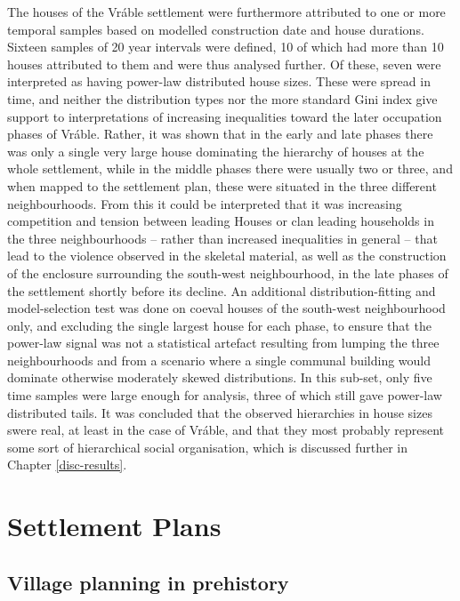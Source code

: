 \documentclass[
  12pt,
  a4paper, twoside]{book}
\begin{document}
The houses of the Vráble settlement were furthermore attributed to one or more temporal samples based on modelled construction date and house durations. Sixteen samples of 20 year intervals were defined, 10 of which had more than 10 houses attributed to them and were thus analysed further. Of these, seven were interpreted as having power-law distributed house sizes. These were spread in time, and neither the distribution types nor the more standard Gini index give support to interpretations of increasing inequalities toward the later occupation phases of Vráble. Rather, it was shown that in the early and late phases there was only a single very large house dominating the hierarchy of houses at the whole settlement, while in the middle phases there were usually two or three, and when mapped to the settlement plan, these were situated in the three different neighbourhoods. From this it could be interpreted that it was increasing competition and tension between leading Houses or clan leading households in the three neighbourhoods -- rather than increased inequalities in general -- that lead to the violence observed in the skeletal material, as well as the construction of the enclosure surrounding the south-west neighbourhood, in the late phases of the settlement shortly before its decline. An additional distribution-fitting and model-selection test was done on coeval houses of the south-west neighbourhood only, and excluding the single largest house for each phase, to ensure that the power-law signal was not a statistical artefact resulting from lumping the three neighbourhoods and from a scenario where a single communal building would dominate otherwise moderately skewed distributions. In this sub-set, only five time samples were large enough for analysis, three of which still gave power-law distributed tails. It was concluded that the observed hierarchies in house sizes swere real, at least in the case of Vráble, and that they most probably represent some sort of hierarchical social organisation, which is discussed further in Chapter \ref{disc-results}.

\hypertarget{part-settlement-plans}{%
\part{Settlement Plans}\label{part-settlement-plans}}

\hypertarget{images-theory}{%
\chapter{Village planning in prehistory}\label{images-theory}}
\end{document}

